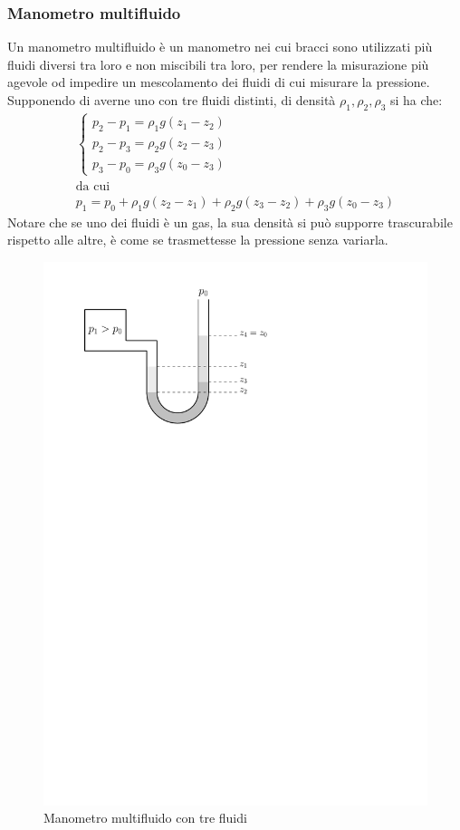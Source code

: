 \subsubsection{Manometro multifluido}
Un manometro multifluido è un manometro nei cui bracci sono utilizzati più fluidi diversi tra loro e non miscibili tra loro, per rendere la misurazione più agevole od impedire un mescolamento dei fluidi di cui misurare la pressione.
Supponendo di averne uno con tre fluidi distinti, di densità $\rho_1, \rho_2, \rho_3 $ si ha che:
	\begin{equation*}
		\begin{gathered}
			\left\{ 
			\begin{gathered}
				p_2 - p_1 = \rho_1 g (z_1 - z_2)\\ 
				p_2 - p_3  = \rho_2 g (z_2 - z_3)\\
				p_3 - p_0 = \rho_3 g (z_0 - z_3)
			\end{gathered} 
			\right. \\
			\text{da cui}\\
			p_1 = p_0 + \rho_1 g (z_2 - z_1) + \rho_2 g (z_3 - z_2) + \rho_3 g (z_0 - z_3)
		\end{gathered}
	\end{equation*}
Notare che se uno dei fluidi è un gas, la sua densità si può supporre trascurabile rispetto alle altre, è come se trasmettesse la pressione senza variarla.
	\begin{figure}[ht]
		\includegraphics[scale=0.75]{./2.3 Manometri/2.3-5}
		\centering
		\caption{Manometro multifluido con tre fluidi}
	\end{figure}
	
